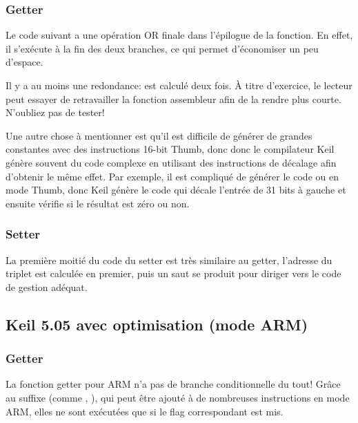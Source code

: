 \subsubsection{Getter}

Le code suivant a une opération OR finale dans l'épilogue de la fonction.
En effet, il s'exécute à la fin des deux branches, ce qui permet d'économiser un
peu d'espace.



Il y a au moins une redondance:  est calculé deux fois.
À titre d'exercice, le lecteur peut essayer de retravailler la fonction assembleur
afin de la rendre plus courte. N'oubliez pas de tester!

Une autre chose à mentionner est qu'il est difficile de générer de grandes constantes
avec des instructions 16-bit Thumb, donc donc le compilateur Keil génère souvent
du code complexe en utilisant des instructions de décalage afin d'obtenir le même
effet.
Par exemple, il est compliqué de générer le code  ou 
en mode Thumb, donc Keil génère le code  qui décale l'entrée de 31 bits à
gauche et ensuite vérifie si le résultat est zéro ou non.

\subsubsection{Setter}

La première moitié du code du setter est très similaire au getter, l'adresse du triplet
est calculée en premier, puis un saut se produit pour diriger vers le code de gestion
adéquat.



\subsection{Keil 5.05 avec optimisation (mode ARM)}

\subsubsection{Getter}

La fonction getter pour ARM n'a pas de branche conditionnelle du tout!
Grâce au suffixe (comme , ), qui peut être ajouté à de nombreuses
instructions en mode ARM, elles ne sont exécutées que si le flag correspondant est
mis.

